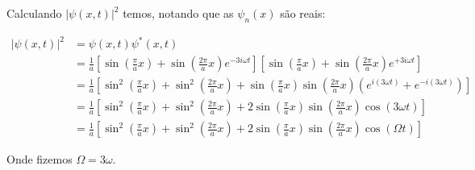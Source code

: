 \documentclass[a4paper, 12pt, notitlepage]{article}
\begin{document}
\begin{enumerate}
\begin{enumerate}
  Calculando $|\psi(x, t)|^2$ temos, notando que as $\psi_n(x)$ são reais:
  
  \begin{align*}
  |\psi(x, t)|^2 &= \psi(x, t) \psi^{\ast}(x, t) \\
  &= \frac{1}{a} \left[\sin\left(\frac{\pi}{a}x\right) + \sin\left(\frac{2\pi}{a}x\right)e^{-3i\omega t}\right] \left[\sin\left(\frac{\pi}{a}x\right) + \sin\left(\frac{2\pi}{a}x\right)e^{+3i\omega t}\right] \\
  &= \frac{1}{a} \left[\sin^2 \left(\frac{\pi}{a} x\right) + \sin^2 \left(\frac{2\pi}{a} x\right) + \sin \left(\frac{\pi}{a}x\right) \sin \left(\frac{2\pi}{a} x\right) \left(e^{i(3\omega t)} + e^{-i(3\omega t)}\right)\right] \\
  &= \frac{1}{a} \left[\sin^2\left(\frac{\pi}{a} x\right) + \sin^2\left(\frac{2\pi}{a} x\right) + 2\sin\left(\frac{\pi}{a}x\right)\sin\left(\frac{2\pi}{a}x\right)\cos\left(3\omega t\right) \right] \\
  &= \frac{1}{a} \left[\sin^2\left(\frac{\pi}{a} x\right) + \sin^2\left(\frac{2\pi}{a} x\right) + 2\sin\left(\frac{\pi}{a}x\right)\sin\left(\frac{2\pi}{a}x\right)\cos\left(\Omega t\right) \right]
  \end{align*}
  
  Onde fizemos $\Omega = 3 \omega$.
  
  
  
  
  

\end{enumerate}
\end{enumerate}
\end{document}
